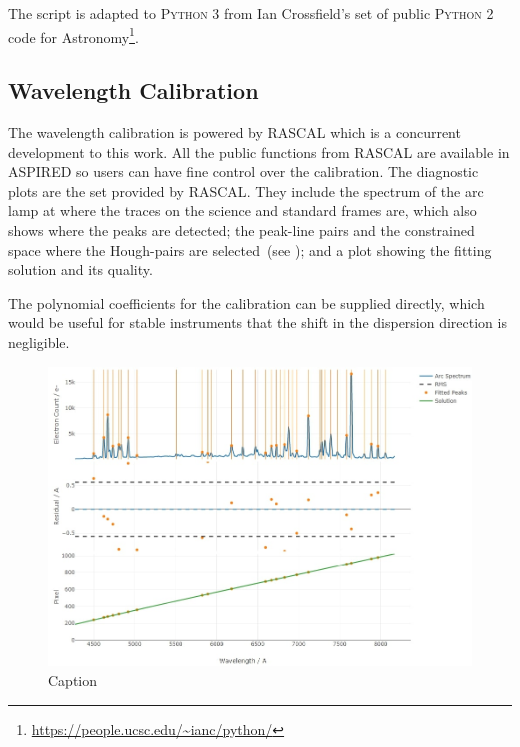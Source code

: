 \documentclass[fleqn,usenatbib]{mnras}
\begin{document}
The script is adapted to \textsc{Python 3} from Ian Crossfield's
set of public \textsc{Python 2} code for 
Astronomy\footnote{\url{https://people.ucsc.edu/~ianc/python/}}.

\subsection{Wavelength Calibration}
The wavelength calibration is powered by \textsc{RASCAL} which
is a concurrent development to this work. All the public
functions from \textsc{RASCAL} are available in \textsc{ASPIRED}
so users can have fine control over the calibration. The
diagnostic plots are the set provided by \textsc{RASCAL}.
They include the spectrum of the arc lamp at where the traces
on the science and standard frames are, which also shows where
the peaks are detected; the peak-line pairs and the constrained
space where the Hough-pairs are
selected~(see \citealt{2020ASPC..527..627V}); and a plot showing
the fitting solution and its quality.

The polynomial coefficients for the calibration can be supplied
directly, which would be useful for stable instruments that
the shift in the dispersion direction is negligible.

\begin{figure}
    \centering
    \includegraphics[width=\columnwidth]{fig_04_wavelength_calibration_diagnostics.jpg}
    \caption{Caption}
    \label{fig:wavecal}
\end{figure}
\end{document}
